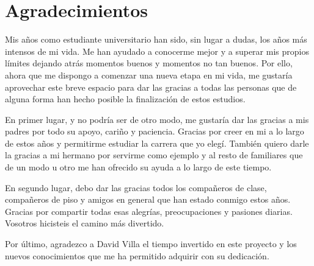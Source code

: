 \chapter{Agradecimientos}

Mis años como estudiante universitario han sido, sin lugar a dudas, los años más intensos de mi
vida. Me han ayudado a conocerme mejor y a superar mis propios límites dejando atrás momentos buenos
y momentos no tan buenos. Por ello, ahora que me dispongo a comenzar una nueva etapa en mi vida, me
gustaría aprovechar este breve espacio para dar las gracias a todas las personas que de alguna forma
han hecho posible la finalización de estos estudios.

En primer lugar, y no podría ser de otro modo, me gustaría dar las gracias a mis padres por todo su
apoyo, cariño y paciencia. Gracias por creer en mi a lo largo de estos años y permitirme estudiar la
carrera que yo elegí. También quiero darle la gracias a mi hermano por servirme como ejemplo y al
resto de familiares que de un modo u otro me han ofrecido su ayuda a lo largo de este tiempo.

En segundo lugar, debo dar las gracias todos los compañeros de clase, compañeros de piso y amigos en
general que han estado conmigo estos años. Gracias por compartir todas esas alegrías, preocupaciones
y pasiones diarias. Vosotros hicisteis el camino más divertido.

Por último, agradezco a David Villa el tiempo invertido en este proyecto y los nuevos conocimientos
que me ha permitido adquirir con su dedicación.


